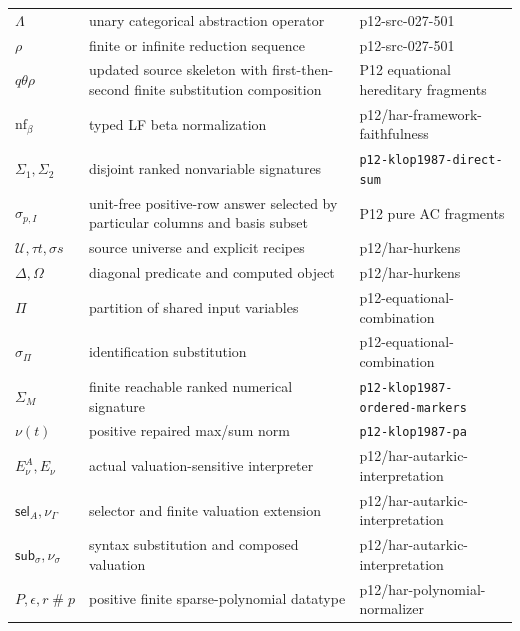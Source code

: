 \begin{longtable}{@{}p{}p{}p{}@{}}
\(\Lambda\) & unary categorical abstraction operator & p12-\allowbreak{}src-\allowbreak{}027-\allowbreak{}501 \\
\(\rho\) & finite or infinite reduction sequence & p12-\allowbreak{}src-\allowbreak{}027-\allowbreak{}501 \\
\(q\theta\rho\) & updated source skeleton with first-then-second finite substitution composition & P12 equational hereditary fragments \\
\(\mathrm{nf}_\beta\) & typed LF beta normalization & p12/\allowbreak{}har-\allowbreak{}framework-\allowbreak{}faithfulness \\
\(\Sigma_1,\allowbreak \Sigma_2\) & disjoint ranked nonvariable signatures & \texttt{p12-\allowbreak{}klop1987-\allowbreak{}direct-\allowbreak{}sum} \\
\(\sigma_{p,I}\) & unit-free positive-row answer selected by particular columns and basis subset & P12 pure AC fragments \\
\(\mathcal U,\allowbreak \tau t,\allowbreak \sigma s\) & source universe and explicit recipes & p12/\allowbreak{}har-\allowbreak{}hurkens \\
\(\Delta,\allowbreak \Omega\) & diagonal predicate and computed object & p12/\allowbreak{}har-\allowbreak{}hurkens \\
\(\Pi\) & partition of shared input variables & p12-\allowbreak{}equational-\allowbreak{}combination \\
\(\sigma_\Pi\) & identification substitution & p12-\allowbreak{}equational-\allowbreak{}combination \\
\(\Sigma_M\) & finite reachable ranked numerical signature & \texttt{p12-\allowbreak{}klop1987-\allowbreak{}ordered-\allowbreak{}markers} \\
\(\nu(t)\) & positive repaired max/sum norm & \texttt{p12-\allowbreak{}klop1987-\allowbreak{}pa} \\
\(E_\nu^A,\allowbreak E_\nu\) & actual valuation-sensitive interpreter & p12/\allowbreak{}har-\allowbreak{}autarkic-\allowbreak{}interpretation \\
\(\mathsf{sel}_A,\allowbreak \nu_\Gamma\) & selector and finite valuation extension & p12/\allowbreak{}har-\allowbreak{}autarkic-\allowbreak{}interpretation \\
\(\mathsf{sub}_\sigma,\allowbreak \nu_\sigma\) & syntax substitution and composed valuation & p12/\allowbreak{}har-\allowbreak{}autarkic-\allowbreak{}interpretation \\
\(P,\allowbreak \epsilon,\allowbreak r\mathbin{\#}p\) & positive finite sparse-polynomial datatype & p12/\allowbreak{}har-\allowbreak{}polynomial-\allowbreak{}normalizer \\

\end{longtable}
